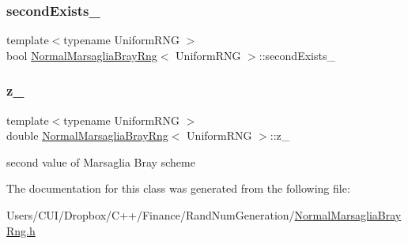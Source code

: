 \hypertarget{class_normal_marsaglia_bray_rng_a6b795b729e795b1b81aa1b30d5dfe8ef}{}\label{class_normal_marsaglia_bray_rng_a6b795b729e795b1b81aa1b30d5dfe8ef} 
\subsubsection{\texorpdfstring{second\+Exists\+\_\+}{secondExists\_}}
{\footnotesize\ttfamily template$<$typename Uniform\+R\+NG $>$ \\
bool \hyperlink{class_normal_marsaglia_bray_rng}{Normal\+Marsaglia\+Bray\+Rng}$<$ Uniform\+R\+NG $>$\+::second\+Exists\+\_\+\hspace{0.3cm}{\ttfamily [private]}}

\hypertarget{class_normal_marsaglia_bray_rng_a6d021a285cd0eb2d95c25cdb8af0ee93}{}\label{class_normal_marsaglia_bray_rng_a6d021a285cd0eb2d95c25cdb8af0ee93} 
\subsubsection{\texorpdfstring{z\+\_\+}{z\_}}
{\footnotesize\ttfamily template$<$typename Uniform\+R\+NG $>$ \\
double \hyperlink{class_normal_marsaglia_bray_rng}{Normal\+Marsaglia\+Bray\+Rng}$<$ Uniform\+R\+NG $>$\+::z\+\_\+\hspace{0.3cm}{\ttfamily [private]}}



second value of Marsaglia Bray scheme 



The documentation for this class was generated from the following file\+:\begin{DoxyCompactItemize}
\item 
Users/\+C\+U\+I/\+Dropbox/\+C++/\+Finance/\+Rand\+Num\+Generation/\hyperlink{_normal_marsaglia_bray_rng_8h}{Normal\+Marsaglia\+Bray\+Rng.\+h}\end{DoxyCompactItemize}
